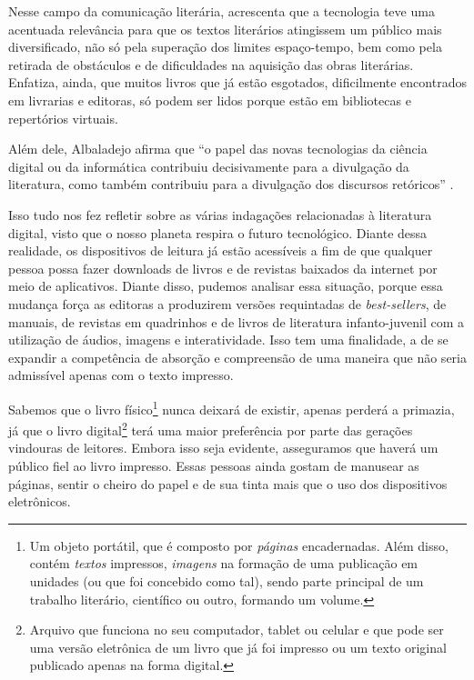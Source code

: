 \begin{refsection}
    Nesse campo da comunicação literária, \textcite{MartinezArnaldos1990Lenguaje} acrescenta que a tecnologia teve uma acentuada relevância para que os textos literários atingissem um público mais diversificado, não só pela superação dos limites espaço-tempo, bem como pela retirada de obstáculos e de dificuldades na aquisição das obras literárias. Enfatiza, ainda, que muitos livros que já estão esgotados, dificilmente encontrados em livrarias e editoras, só podem ser lidos porque estão em bibliotecas e repertórios virtuais. 

    Além dele, Albaladejo afirma que “o papel das novas tecnologias da ciência digital ou da informática contribuiu decisivamente para a divulgação da literatura, como também contribuiu para a divulgação dos discursos retóricos” \cite[p.~9--18]{Albaladejo2001}.

    Isso tudo nos fez refletir sobre as várias indagações relacionadas à literatura digital, visto que o nosso planeta respira o futuro tecnológico. Diante dessa realidade, os dispositivos de leitura já estão acessíveis a fim de que qualquer pessoa possa fazer downloads de livros e de revistas baixados da internet por meio de aplicativos. Diante disso, pudemos analisar essa situação, porque essa mudança força as editoras a produzirem versões requintadas de \textit{best-sellers}, de manuais, de revistas em quadrinhos e de livros de literatura infanto-juvenil com a utilização de áudios, imagens e interatividade. Isso tem uma finalidade, a de se expandir a competência de absorção e compreensão de uma maneira que não seria admissível apenas com o texto impresso.

    Sabemos que o livro físico\footnote{Um objeto portátil, que é composto por \textit{páginas} encadernadas. Além disso, contém \textit{textos} impressos, \textit{imagens} na formação de uma publicação em unidades (ou que foi concebido como tal), sendo parte principal de um trabalho literário, científico ou outro, formando um volume.} nunca deixará de existir, apenas perderá a primazia, já que o livro digital\footnote{Arquivo que funciona no seu computador, tablet ou celular e que pode ser uma versão eletrônica de um livro que já foi impresso ou um texto original publicado apenas na forma digital. } terá uma maior preferência por parte das gerações vindouras de leitores. Embora isso seja evidente, asseguramos que haverá um público  fiel   ao  livro   impresso.  Essas   pessoas   ainda  gostam   de manusear  as páginas, sentir o cheiro do papel e de sua tinta mais que o uso dos dispositivos eletrônicos. 


\end{refsection}
